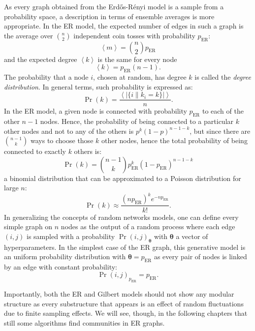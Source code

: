 As every graph obtained from the Erd\H{o}s-Rényi model is a sample from a probability space, a description in terms of ensemble averages is more appropriate.
In the ER model, the expected number of edges in such a graph is the average over $\binom{n}{2}$ independent coin tosses with probability $p_{\textrm{ER}}$:
\begin{equation}
\left< m  \right> = \binom{n}{2}p_{\textrm{ER}}
\end{equation}
and the expected degree $\left< k \right>$ is the same for every node
\begin{equation}
\left< k \right> = p_{\textrm{ER}}(n-1).
\end{equation}
The probability that a node $i$, chosen at random, has degree $k$ is called the \emph{degree distribution}. In general terms, such probability is expressed as:
\begin{equation}
\Pr(k) = \frac{\left< |\{ i \| k_i=k \}| \right>}{n}.
\end{equation}
In the ER model, a given node is connected with probability $p_{\textrm{ER}}$ to each of the other $n-1$ nodes. Hence, the probability of being connected to a particular $k$ other nodes and not to any of the others is $p^k(1-p)^{n-1-k}$, but since there are $\binom{n-1}{k}$ ways to choose those $k$ other nodes, hence the total probability of being connected to exactly $k$ others is:
\begin{equation}
\Pr(k) = \binom{n-1}{k}p_{\textrm{ER}}^k(1-p_{\textrm{ER}})^{n-1-k}
\end{equation}
a binomial distribution that can be approximated to a Poisson distribution for large $n$:
\begin{equation}
\Pr(k) \approx \frac{(n p_{\textrm{ER}})^k e^{-n p_{\textrm{ER}}} }{k!}.
\end{equation}
\bigbreak
In generalizing the concepts of random networks models, one can define every simple graph on $n$ nodes as the output of a random process where each edge $(i,j) $ is sampled with a probability $\Pr(i,j)_{ \boldsymbol \theta}$ with $\boldsymbol \theta$ a vector of hyperparameters. In the simplest case of the ER graph, this generative model is an uniform probability distribution with $\boldsymbol \theta=p_{\textrm{ER}}$ as every pair of nodes is linked by an edge with constant probability:
\begin{equation}
\Pr({i,j})_{p_{\textrm{ER}}} = p_{\textrm{ER}}.
\end{equation}

Importantly, both the ER and Gilbert models should not show any modular structure as every substructure that appears is an effect of random fluctuations due to finite sampling effects. We will see, though, in the following chapters that still some algorithms find communities in ER graphs.

